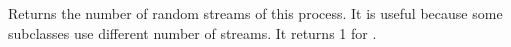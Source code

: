 \begin{tabb} Returns the number of random streams of this process.
It is useful because some subclasses use different number
of streams.  It returns 1 for .
\end{tabb}
\begin{code}
\begin{hide}
}
\end{hide}
\end{code}
